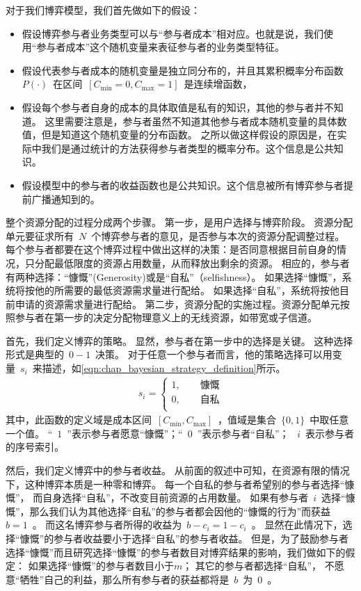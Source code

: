 对于我们博弈模型，我们首先做如下的假设：
\begin{itemize}
    \item 假设博弈参与者业务类型可以与“参与者成本”相对应。也就是说，我们使用“参与者成本”这个随机变量来表征参与者的业务类型特征。
    \item 假设代表参与者成本的随机变量是独立同分布的，并且其累积概率分布函数~$P(\cdot)$~在区间~$[C_{\min}=0, C_{\max}=1]$~是连续增函数，
    \item 假设每个参与者自身的成本的具体取值是私有的知识，其他的参与者并不知道。
    这里需要注意是，参与者虽然不知道其他参与者成本随机变量的具体数值，但是知道这个随机变量的分布函数。
    之所以做这样假设的原因是，在实际中我们是通过统计的方法获得参与者类型的概率分布。这个信息是公共知识。
    \item 假设模型中的参与者的收益函数也是公共知识。这个信息被所有博弈参与者提前广播通知到的。
\end{itemize}

整个资源分配的过程分成两个步骤。
第一步，是用户选择与博弈阶段。
资源分配单元要征求所有~$N$~个博弈参与者的意见，是否参与本次的资源分配调整过程。
每个参与者都要在这个博弈过程中做出这样的决策：是否同意根据目前自身的情况，只分配最低限度的资源占用数量，从而释放出剩余的资源。
相应的，参与者有两种选择：“慷慨”(Generosity)或是“自私”（selfishness）。
如果选择“慷慨”，系统将按他的所需要的最低资源需求量进行配给。
如果选择“自私”，系统将按他目前申请的资源需求量进行配给。
第二步，资源分配的实施过程。资源分配单元按照参与者在第一步的决定分配物理意义上的无线资源，如带宽或子信道。

首先，我们定义博弈的策略。
显然，参与者在第一步中的选择是关键。
这种选择形式是典型的~$0-1$~决策。
对于任意一个参与者而言，他的策略选择可以用变量~$s_i$~来描述，如\eqref{eqn:chap_bayesian_strategy_definition}所示。
\begin{align}
    s_i = \begin{cases}
        1, \qquad\text{慷慨}\\
        0, \qquad\text{自私}\\
    \end{cases}
    \label{eqn:chap_bayesian_strategy_definition}
\end{align}
其中，此函数的定义域是成本区间~$[C_{\min}, C_{\max}]$~，值域是集合~$\{0,1\}$~中取任意一个值。
“~$1$~”表示参与者愿意“慷慨”；“~$0$~”表示参与者“自私”；
~$i$~表示参与者的序号索引。

然后，我们定义博弈中的参与者收益。
从前面的叙述中可知，在资源有限的情况下，这种博弈本质是一种零和博弈。
每一个自私的参与者希望别的参与者选择“慷慨”，
而自身选择“自私”，不改变目前资源的占用数量。
如果有参与者~$i$~选择“慷慨”，那么我们认为其他选择“自私”的参与者都会因他的“慷慨的行为”而获益~$b=1$~。
而这名博弈参与者所得的收益为~$b-c_i= 1-c_i$~。
显然在此情况下，选择“慷慨”的参与者收益要小于选择“自私”的参与者收益。
但是，为了鼓励参与者选择“慷慨”而且研究选择“慷慨”的参与者数目对博弈结果的影响，我们做如下的假定：
如果选择“慷慨”的参与者数目小于$m$； 其它的参与者都选择“自私”，
不愿意“牺牲”自己的利益，那么所有参与者的获益都将是~$b$~为~$0$~。

